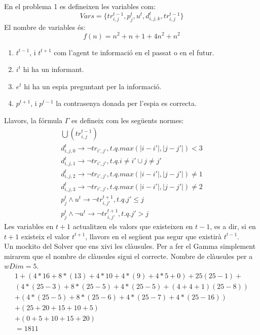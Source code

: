 
En el problema 1 es defineixen les variables com:
\[
Vars = \{tr_{i, j}^{t-1}, p_j^t, u^t, d_{i, j, k}^t, tr_{i, j}^{t-1}\}
\]
El nombre de variables és:
\[
f(n) = n^2 + n + 1 + 4n^2 + n^2
\]
\begin{enumerate}
	\item $t^{t-1}$, i $t^{t+1}$ com l'agent te informació en el passat o en el futur.
	\item $i^t$ hi ha un informant.
	\item $e^t$ hi ha un espia preguntant per la informació.
	\item $p^{t+1}$, i $p^{t-1}$ la contrasenya donada per l'espia es correcta.
\end{enumerate}
Llavors, la fórmula $\Gamma$ es defineix com les següents normes:
\begin{gather}
\bigcup(tr_{i, j}^{t-1})\\
d_{i, j, 0}^t \rightarrow \neg tr_{i', j'}, t.q. max(|i - i'|, |j - j'|) < 3\\
d_{i, j, 1}^t \rightarrow \neg tr_{i', j'}, t.q. i \neq i' \cup j \neq j'\\
d_{i, j, 2}^t \rightarrow \neg tr_{i', j'}, t.q. max(|i - i'|, |j - j'|) \neq 1\\
d_{i, j, 3}^t \rightarrow \neg tr_{i', j'}, t.q. max(|i - i'|, |j - j'|) \neq 2\\
p_j^t \wedge u^t \rightarrow \neg tr_{i, j'}^{t+1}, t.q. j' \leq j\\
p_j^t \wedge \neg u^t \rightarrow \neg tr_{i, j'}^{t+1}, t.q. j' > j
\end{gather}
Les variables en $t + 1$ actualitzen els valors que existeixen en $t-1$, es a dir, si 
en $t+1$ existeix el valor $t^{t+1}$, llavors en el següent pas segur que existirà $t^{t-1}$.\\

Un mockito del Solver que ens xivi les clàusules.
Per a fer el Gamma simplement mirarem que el nombre de clàusules sigui
el correcte. Nombre de clàusules per a $wDim = 5$.
\begin{gather}
	1 + (4*16 + 8*(13) +4*10 + 4*(9) + 4*5 + 0) + 25(25 - 1) +\\
	(4 * (25 - 3) + 8*(25-5) + 4*(25-5)+ (4+4+1)(25-8))\\
	+ (4 * (25 - 5) + 8*(25 - 6) + 4*(25 -7) + 4*(25 - 16))\\
	+ (25 + 20 + 15 + 10 + 5)\\
		+ (0 + 5 + 10 + 15 + 20)\\
	= 1811
\end{gather}
